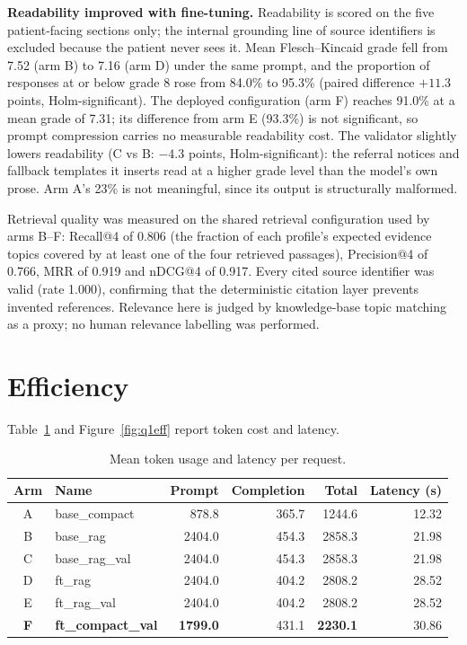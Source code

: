 \textbf{Readability improved with fine-tuning.} Readability is scored on the five
patient-facing sections only; the internal grounding line of source
identifiers is excluded because the patient never sees it. Mean Flesch--Kincaid
grade fell from 7.52 (arm B) to 7.16 (arm D) under the same prompt, and the
proportion of responses at or below grade 8 rose from 84.0\% to 95.3\% (paired
difference $+11.3$ points, Holm-significant). The deployed configuration
(arm F) reaches 91.0\% at a mean grade of 7.31; its difference from arm E
(93.3\%) is not significant, so prompt compression carries no measurable
readability cost. The validator slightly lowers readability (C vs B:
$-4.3$ points, Holm-significant): the referral notices and fallback templates it
inserts read at a higher grade level than the model's own prose. Arm A's 23\% is not meaningful, since its output is
structurally malformed.

Retrieval quality was measured on the shared retrieval configuration used by
arms B--F: Recall@4 of 0.806 (the fraction of each profile's expected evidence
topics covered by at least one of the four retrieved passages), Precision@4 of
0.766, MRR of 0.919 and nDCG@4 of 0.917. Every cited source identifier was
valid (rate 1.000), confirming that the deterministic citation layer prevents
invented references. Relevance here is judged by knowledge-base topic matching
as a proxy; no human relevance labelling was performed.

\section{Efficiency}
\label{sec:q1_efficiency}

Table~\ref{tab:q1_eff} and Figure~\ref{fig:q1eff} report token cost and latency.

\begin{table}[H]
\centering
\caption{Mean token usage and latency per request.}
\label{tab:q1_eff}
\begin{tabular}{@{}cl rrrr@{}}
\toprule
\textbf{Arm} & \textbf{Name} & \textbf{Prompt} & \textbf{Completion} &
\textbf{Total} & \textbf{Latency (s)} \\
\midrule
A & base\_compact & 878.8 & 365.7 & 1244.6 & 12.32 \\
B & base\_rag & 2404.0 & 454.3 & 2858.3 & 21.98 \\
C & base\_rag\_val & 2404.0 & 454.3 & 2858.3 & 21.98 \\
D & ft\_rag & 2404.0 & 404.2 & 2808.2 & 28.52 \\
E & ft\_rag\_val & 2404.0 & 404.2 & 2808.2 & 28.52 \\
\textbf{F} & \textbf{ft\_compact\_val} & \textbf{1799.0} & 431.1 &
\textbf{2230.1} & 30.86 \\
\bottomrule
\end{tabular}
\end{table}

